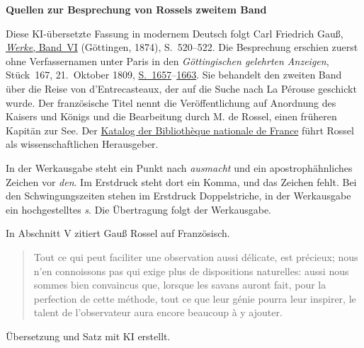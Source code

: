 \clearpage\thispagestyle{empty}
\begin{center}\textbf{Quellen zur Besprechung von Rossels zweitem Band}\end{center}
\noindent Diese KI-übersetzte Fassung in modernem Deutsch folgt Carl Friedrich Gauß, \href{https://gdz.sub.uni-goettingen.de/id/PPN236007467}{\emph{Werke}, Band~VI} (Göttingen, 1874), S.~520–522. Die Besprechung erschien zuerst ohne Verfassernamen unter Paris in den \emph{Göttingischen gelehrten Anzeigen}, Stück~167, 21.~Oktober 1809, \href{https://images.p.sub.uni-goettingen.de/iiif/image/gdz:PPN319721507_1809:00001661/full/1650,/0/default.jpg}{S.~1657}–\href{https://images.p.sub.uni-goettingen.de/iiif/image/gdz:PPN319721507_1809:00001667/full/1650,/0/default.jpg}{1663}. Sie behandelt den zweiten Band über die Reise von d’Entrecasteaux, der auf die Suche nach La Pérouse geschickt wurde. Der französische Titel nennt die Veröffentlichung auf Anordnung des Kaisers und Königs und die Bearbeitung durch M. de Rossel, einen früheren Kapitän zur See. Der \href{https://catalogue.bnf.fr/ark:/12148/cb43383186m}{Katalog der Bibliothèque nationale de France} führt Rossel als wissenschaftlichen Herausgeber.
\par\smallskip\noindent In der Werkausgabe steht ein Punkt nach \emph{ausmacht} und ein apostrophähnliches Zeichen vor \emph{den}. Im Erstdruck steht dort ein Komma, und das Zeichen fehlt. Bei den Schwingungszeiten stehen im Erstdruck Doppelstriche, in der Werkausgabe ein hochgestelltes \emph{s}. Die Übertragung folgt der Werkausgabe.
\par\smallskip\noindent In Abschnitt V zitiert Gauß Rossel auf Französisch.
\begin{quote}
Tout ce qui peut faciliter une observation aussi délicate, est précieux; nous n'en connoissons pas qui exige plus de dispositions naturelles: aussi nous sommes bien convaincus que, lorsque les savans auront fait, pour la perfection de cette méthode, tout ce que leur génie pourra leur inspirer, le talent de l'observateur aura encore beaucoup à y ajouter.
\end{quote}
\noindent Übersetzung und Satz mit KI erstellt.
\clearpage

